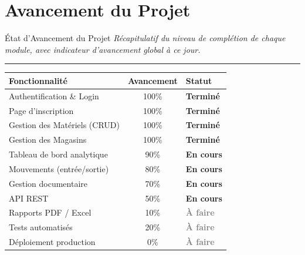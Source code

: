 \documentclass[
  aspectratio=169,       %
  xcolor=dvipsnames,     %
  t                      %
]{beamer}
\newcommand{\framedesc}[1]{%
  {\small\itshape\textcolor{PrimaryDark!80}{#1}}\par%
  \vspace{1pt}%
  {\color{PrimaryMid}\rule{\textwidth}{0.4pt}}%
  \vspace{4pt}%
}
\begin{document}
\section{Avancement du Projet}

\begin{frame}{État d'Avancement du Projet}
  \framedesc{Récapitulatif du niveau de complétion de chaque module, avec indicateur d'avancement global à ce jour.}

  \begin{center}
  \begin{tabular}{p{4.5cm} c p{4.5cm}}
    \toprule
    \textbf{Fonctionnalité} & \textbf{Avancement} & \textbf{Statut} \\
    \midrule
    Authentification \& Login     & 100\% & \textcolor{PrimaryMid}{\textbf{Terminé}} \\
    Page d'inscription            & 100\% & \textcolor{PrimaryMid}{\textbf{Terminé}} \\
    Gestion des Matériels (CRUD)  & 100\% & \textcolor{PrimaryMid}{\textbf{Terminé}} \\
    Gestion des Magasins          & 100\% & \textcolor{PrimaryMid}{\textbf{Terminé}} \\
    Tableau de bord analytique    & 90\%  & \textcolor{AccentOrange}{\textbf{En cours}} \\
    Mouvements (entrée/sortie)    & 80\%  & \textcolor{AccentOrange}{\textbf{En cours}} \\
    Gestion documentaire          & 70\%  & \textcolor{AccentOrange}{\textbf{En cours}} \\
    API REST                      & 50\%  & \textcolor{AccentOrange}{\textbf{En cours}} \\
    Rapports PDF / Excel          & 10\%  & \textcolor{gray}{\textbf{À faire}} \\
    Tests automatisés             & 20\%  & \textcolor{gray}{\textbf{À faire}} \\
    Déploiement production        & 0\%   & \textcolor{gray}{\textbf{À faire}} \\
    \bottomrule
  \end{tabular}
  \end{center}


\end{frame}
\end{document}
